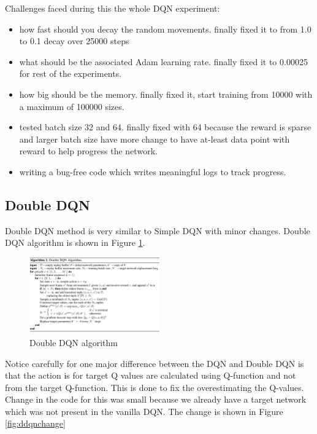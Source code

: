 \documentclass[10pt,twocolumn,letterpaper]{article}
\begin{document}
 Challenges faced during this the whole DQN experiment:
\begin{itemize}
    \item how fast should you decay the random movements. finally fixed it to from 1.0 to 0.1 decay over 25000 steps
    \item what should be the associated Adam learning rate. finally fixed it to 0.00025 for rest of the experiments.
    \item how big should be the memory. finally fixed it, start training from 10000 with a maximum of 100000 sizes.
    \item tested batch size 32 and 64. finally fixed with 64 because the reward is sparse and larger batch size have more change to have at-least data point with reward to help progress the network.
    \item writing a bug-free code which writes meaningful logs to track progress.
\end{itemize}

\subsection{Double DQN}

Double DQN method \cite{double_qlearning} is very similar to Simple DQN with minor changes. Double DQN algorithm is shown in Figure \ref{fig:doubledqn}.


\begin{figure}[h]
  \centering
    \includegraphics[width=0.50\textwidth]{images/ddqn.png}
    \caption{Double DQN algorithm }
    \label{fig:doubledqn}
\end{figure}

Notice carefully for one major difference between the DQN and Double DQN is that the action is for target Q values are calculated using Q-function and not from the target Q-function. This is done to fix the overestimating the Q-values. Change in the code for this was small because we already have a target network which was not present in the vanilla DQN. The change is shown in Figure \ref{fig:ddqnchange}
\end{document}
